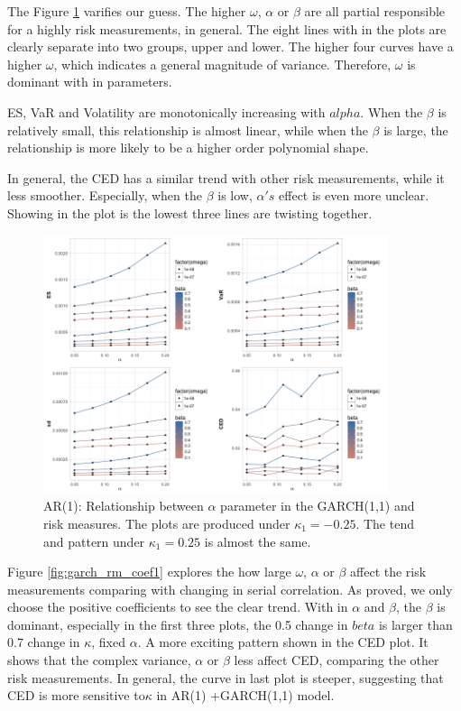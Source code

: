 \documentclass[11pt]{article}
\begin{document}
The Figure \ref{fig:garch_rm_alpha1} varifies our guess. The higher $\omega$, $\alpha$ or $\beta$ are all partial responsible for a highly risk measurements, in general. The eight lines with in the plots are clearly separate into two groups, upper and lower. The higher four curves have a higher $\omega$, which indicates a general magnitude of variance. Therefore, $\omega$ is dominant with in parameters.

ES, VaR and Volatility are monotonically increasing with $alpha$. When the $\beta$ is relatively small, this relationship is almost linear, while when the $\beta$ is large, the relationship is more likely to be a higher order polynomial shape.

In general, the CED has a similar trend with other risk measurements, while it less smoother. Especially, when the $\beta$ is low, $\alpha's$ effect is even more unclear. Showing in the plot is the lowest three lines are twisting together. 
\begin{figure}[H]
\centering
\includegraphics[width = 0.9\textwidth]{../figures/simulation_garch/garch_AR1_risk_measures_neg_alpha.png}
\caption{AR(1): Relationship between $\alpha$ parameter in the GARCH(1,1) and risk measures. The plots are produced under $\kappa_1 = -0.25$. The tend and pattern under $\kappa_1 = 0.25$ is almost the same.}
\label{fig:garch_rm_alpha1}
\end{figure}

Figure \ref{fig:garch_rm_coef1} explores the how large $\omega$, $\alpha$ or $\beta$ affect the risk measurements comparing with changing in serial correlation. As proved, we only choose the positive coefficients to see the clear trend. With in $\alpha$ and $\beta$, the $\beta$ is dominant, especially in the first three plots, the 0.5 change in $beta$ is larger than 0.7 change in $\kappa$, fixed $\alpha$. A more exciting pattern shown in the CED plot. It shows that the complex variance, $\alpha$ or $\beta$ less affect CED, comparing the other risk measurements. In general, the curve in last plot is steeper, suggesting that CED is more sensitive to$\kappa$ in AR(1) +GARCH(1,1) model.
\end{document}
